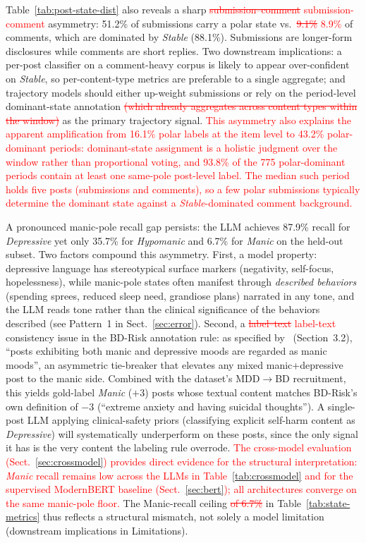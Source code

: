 \documentclass[runningheads]{llncs}
\newcommand{\rev}[1]{\textcolor{red}{#1}}
\newcommand{\del}[1]{\textcolor{red}{\sout{#1}}}
\newcommand{\rev}[1]{#1}
\newcommand{\del}[1]{}
\begin{document}
Table~\ref{tab:post-state-dist} also reveals a sharp \del{submission--comment} \rev{submission-comment} asymmetry: 51.2\% of submissions carry a polar state vs.~\del{9.1\% }\rev{8.9\%} of comments, which are dominated by \emph{Stable} (88.1\%). Submissions are longer-form disclosures while comments are short replies. Two downstream implications: a per-post classifier on a comment-heavy corpus is likely to appear over-confident on \emph{Stable}, so per-content-type metrics are preferable to a single aggregate; and trajectory models should either up-weight submissions or rely on the period-level dominant-state annotation\del{ (which already aggregates across content types within the window)} as the primary trajectory signal. \rev{This asymmetry also explains the apparent amplification from 16.1\% polar labels at the item level to 43.2\% polar-dominant periods: dominant-state assignment is a holistic judgment over the window rather than proportional voting, and 93.8\% of the 775 polar-dominant periods contain at least one same-pole post-level label. The median such period holds five posts (submissions and comments), so a few polar submissions typically determine the dominant state against a \emph{Stable}-dominated comment background.}

A pronounced manic-pole recall gap persists: the LLM achieves 87.9\% recall for \emph{Depressive} yet only 35.7\% for \emph{Hypomanic} and 6.7\% for \emph{Manic} on the held-out subset. Two factors compound this asymmetry. First, a model property: depressive language has stereotypical surface markers (negativity, self-focus, hopelessness), while manic-pole states often manifest through \emph{described behaviors} (spending sprees, reduced sleep need, grandiose plans) narrated in any tone, and the LLM reads tone rather than the clinical significance of the behaviors described (see Pattern~1 in Sect.~\ref{sec:error}). Second, a \del{label--text} \rev{label-text} consistency issue in the BD-Risk annotation rule: as specified by~\cite{lee2024detecting} (Section~3.2), ``posts exhibiting both manic and depressive moods are regarded as manic moods'', an asymmetric tie-breaker that elevates any mixed manic+depressive post to the manic side. Combined with the dataset's MDD$\rightarrow$BD recruitment, this yields gold-label \emph{Manic} ($+3$) posts whose textual content matches BD-Risk's own definition of $-3$ (``extreme anxiety and having suicidal thoughts''). A single-post LLM applying clinical-safety priors (classifying explicit self-harm content as \emph{Depressive}) will systematically underperform on these posts, since the only signal it has is the very content the labeling rule overrode. \rev{The cross-model evaluation (Sect.~\ref{sec:crossmodel}) provides direct evidence for the structural interpretation: \emph{Manic} recall remains low across the LLMs in Table~\ref{tab:crossmodel} and for the supervised ModernBERT baseline (Sect.~\ref{sec:bert}); all architectures converge on the same manic-pole floor.} The Manic-recall ceiling\del{ of 6.7\%} in Table~\ref{tab:state-metrics} thus reflects a structural mismatch, not solely a model limitation (downstream implications in Limitations).
\end{document}
